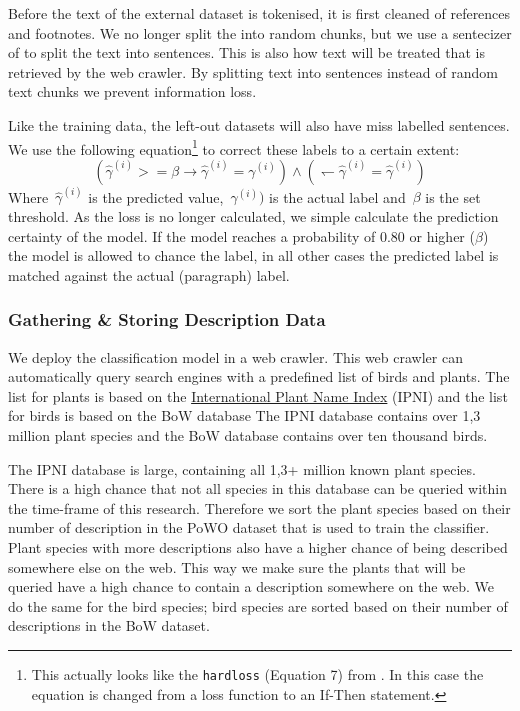 \documentclass[a4paper, 12pt, oneside]{book} %
\begin{document}
Before the text of the external dataset is tokenised, it is first cleaned of references and footnotes.
We no longer split the into random chunks, but we use a sentecizer of \textcite{honnibal_spacy_2020} to split the text into sentences.
This is also how text will be treated that is retrieved by the web crawler.
By splitting text into sentences instead of random text chunks we prevent information loss.

Like the training data, the left-out datasets will also have miss labelled sentences.
We use the following equation\footnote{This actually looks like the \texttt{hardloss} (Equation 7) from \textcite{reed_training_2015}. In this case the equation is changed from a loss function to an If-Then statement.} to correct these labels to a certain extent:
\begin{equation} \label{eq:softloss_ifthen}
(\hat{\gamma}^{(i)} >= \beta \rightarrow \hat{\gamma}^{(i)} = \gamma^{(i)}) \wedge ( \leftharpoondown \hat{\gamma}^{(i)} = \hat{\gamma}^{(i)})
\end{equation}
Where~$\hat{\gamma}^{(i)}$ is the predicted value,~$\gamma^{(i)})$ is the actual label and~$\beta$ is the set threshold. 
As the loss is no longer calculated, we simple calculate the prediction certainty of the model.
If the model reaches a probability of 0.80 or higher (\(\beta\)) the model is allowed to chance the label, in all other cases the predicted label is matched against the actual (paragraph) label.


\subsubsection{Gathering \& Storing Description Data}
We deploy the classification model in a web crawler.
This web crawler can automatically query search engines with a predefined list of birds and plants.
The list for plants is based on the \href{https://www.ipni.org/}{International Plant Name Index} (IPNI) and the list for birds is based on the BoW database %
The IPNI database contains over 1,3 million plant species and the BoW database contains over ten thousand birds.

The IPNI database is large, containing all 1,3+ million known plant species.
There is a high chance that not all species in this database can be queried within the time-frame of this research.
Therefore we sort the plant species based on their number of description in the PoWO dataset that is used to train the classifier.
Plant species with more descriptions also have a higher chance of being described somewhere else on the web.
This way we make sure the plants that will be queried have a high chance to contain a description somewhere on the web.
We do the same for the bird species; bird species are sorted based on their number of descriptions in the BoW dataset.
\end{document}
